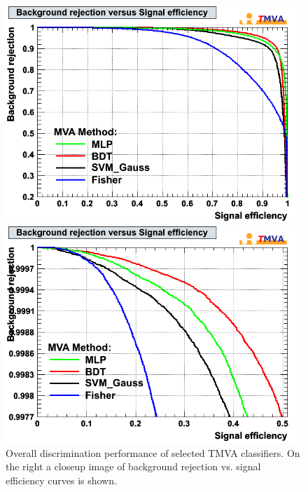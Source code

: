 \documentclass[a4paper]{jpconf}
\begin{document}
\begin{figure}[h]
 \begin{minipage}{8.0cm}
\includegraphics[width=1.0\textwidth]{images/mk_roc.png}
\end{minipage}
 \hfill
\begin{minipage}{8.0cm}
\includegraphics[width=1.0\textwidth]{images/mk_roc_zoomed.png}
\end{minipage}
\caption{Overall discrimination performance of selected TMVA classifiers. 
On the right a closeup image of background rejection vs. signal efficiency curves is shown.}
\label{fig:roc}
\end{figure}
\end{document}
